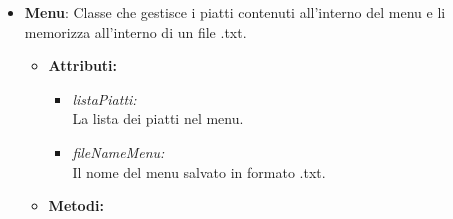 \documentclass{article}
\begin{document}
    \begin{itemize}
        \item \textbf{Menu}: Classe che gestisce i piatti contenuti all'interno del menu e li memorizza all'interno di un file .txt.
        
        \begin{itemize}
            \item \textbf{Attributi:}
            
            \begin{itemize}
                \item \textit{listaPiatti:}\\La lista dei piatti nel menu. \\
                \item \textit{fileNameMenu:}\\Il nome del menu salvato in formato .txt. \\
            \end{itemize}
            
            \item \textbf{Metodi:}
            

\end{itemize}
\end{itemize}
\end{document}
